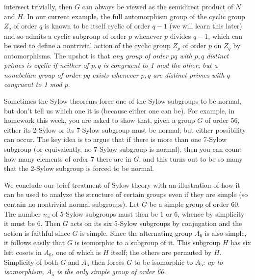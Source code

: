 \documentclass[10pt]{article} \usepackage{amsmath, amssymb}
\begin{document}
intersect trivially, then $G$ can always be viewed as the semidirect
product of $N$ and $H$. In our current example, the full automorphism
group of the cyclic group $Z_q$ of order $q$ is known to be itself
cyclic of order $q-1$ (we will learn this later) and so admits a cyclic
subgroup of order $p$ whenever $p$ divides $q-1$, which can be used to
define a nontrivial action of the cyclic group $Z_p$ of order $p$ on
$Z_q$ by automorphisms. The upshot is that {\sl any group of order $pq$
  with $p,q$ distinct primes is cyclic if neither of $p,q$ is congruent
  to 1 mod the other, but a nonabelian group of order $pq$ exists
  whenever $p,q$ are distinct primes with $q$ congruent to 1 mod $p$}.

Sometimes the Sylow theorems force one of the Sylow subgroups to be
normal, but don't tell us which one it is (because either one can be).
For example, in homework this week, you are asked to show that, given a
group $G$ of order 56, either its 2-Sylow or its 7-Sylow subgroup must
be normal; but either possibility can occur. The key idea is to argue
that if there is more than one 7-Sylow subgroup (or equivalently, no
7-Sylow subgroup is normal), then you can count how many elements of
order 7 there are in $G$, and this turns out to be so many that the
2-Sylow subgroup is forced to be normal.

We conclude our brief treatment of Sylow theory with an illustration of
how it can be used to analyze the structure of certain groups even if
they are simple (so contain no nontrivial normal subgroups). Let $G$ be
a simple group of order 60. The number $n_5$ of 5-Sylow subgroups must
then be 1 or 6, whence by simplicity it must be 6. Then $G$ acts on its
six 5-Sylow subgroups by conjugation and the action is faithful since
$G$ is simple. Since the alternating group $A_6$ is also simple, it
follows easily that $G$ is isomorphic to a subgroup of it. This subgroup
$H$ has six left cosets in $A_6$, one of which is $H$ itself; the others
are permuted by $H$. Simplicity of both $G$ and $A_5$ then forces $G$ to
be isomorphic to $A_5$: {\sl up to isomorphism, $A_5$ is the only simple
  group of order 60}.
\end{document}
